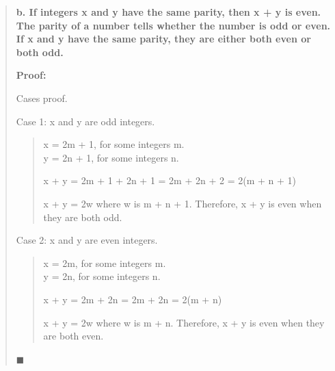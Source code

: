\documentclass[11pt, oneside]{article}
\begin{document}
\begin{quote}
    \textbf{b. If integers x and y have the same parity, then x + y is even. The parity of a number tells whether the number is odd or even. If x and y have the same parity, they are either both even or both odd.}
    
    \textbf{Proof:}
    
    Cases proof.
    
    Case 1: x and y are odd integers.
    
    \begin{quote}
        x = 2m + 1, for some integers m. \\
        y = 2n + 1, for some integers n.
    
        x + y = 2m + 1 + 2n + 1 = 2m + 2n + 2 = 2(m + n + 1)
        
        x + y = 2w where w is m + n + 1. Therefore, x + y is even when they are both odd.
    \end{quote}
    
    Case 2: x and y are even integers.
    
    \begin{quote}
        x = 2m, for some integers m. \\
        y = 2n, for some integers n.
    
        x + y = 2m + 2n = 2m + 2n = 2(m + n)
        
        x + y = 2w where w is m + n. Therefore, x + y is even when they are both even.
    \end{quote}
    
    $\blacksquare$
\end{quote}
\end{document}
